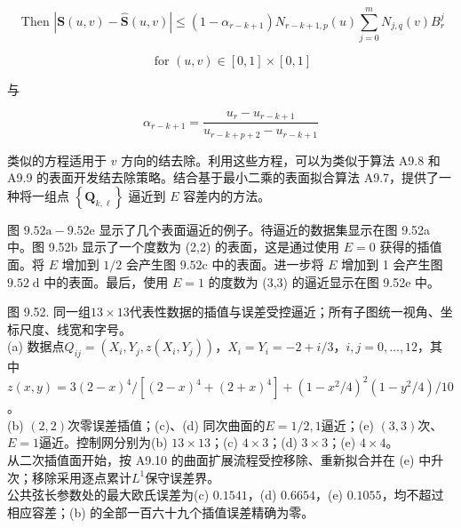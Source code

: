 \documentclass[../main.tex]{subfiles}
\begin{document}
\[
\text{ Then }\left| {\mathbf{S}\left( {u,v}\right)  - \widehat{\mathbf{S}}\left( {u,v}\right) }\right|  \leq  \left( {1 - {\alpha }_{r - k + 1}}\right) {N}_{r - k + 1,p}\left( u\right) \mathop{\sum }\limits_{{j = 0}}^{m}{N}_{j,q}\left( v\right) {B}_{r}^{j}
\]

\[
\text{ for }\left( {u,v}\right)  \in  \left\lbrack  {0,1}\right\rbrack   \times  \left\lbrack  {0,1}\right\rbrack   \tag{9.89}
\]

与

\[
{\alpha }_{r - k + 1} = \frac{{u}_{r} - {u}_{r - k + 1}}{{u}_{r - k + p + 2} - {u}_{r - k + 1}}
\]

类似的方程适用于 \(v\) 方向的结去除。利用这些方程，可以为类似于算法 A9.8 和 A9.9 的表面开发结去除策略。结合基于最小二乘的表面拟合算法 A9.7，提供了一种将一组点 \(\left\{  {\mathbf{Q}}_{k,\ell }\right\}\) 逼近到 \(E\) 容差内的方法。

图 \({9.52}\mathrm{a} - {9.52}\mathrm{e}\) 显示了几个表面逼近的例子。待逼近的数据集显示在图 9.52a 中。图 9.52b 显示了一个度数为 (2,2) 的表面，这是通过使用 \(E = 0\) 获得的插值面。将 \(E\) 增加到 \(1/2\) 会产生图 \({9.52}\mathrm{c}\) 中的表面。进一步将 \(E\) 增加到 1 会产生图 \({9.52}\mathrm{\;d}\) 中的表面。最后，使用 \(E = 1\) 的度数为 (3,3) 的逼近显示在图 9.52e 中。







\begin{center}
\begin{minipage}{34cm}
\vspace*{.6\baselineskip}
\centering
{}\par\smallskip
{}\par\smallskip
{}
\par\smallskip
图 9.52. 同一组$13\times13$代表性数据的插值与误差受控逼近；所有子图统一视角、坐标尺度、线宽和字号。\\
(a) 数据点$Q_{ij}=(X_i,Y_j,z(X_i,Y_j))$，$X_i=Y_i=-2+i/3$，$i,j=0,\ldots,12$，其中\\
$z(x,y)=3(2-x)^4/[(2-x)^4+(2+x)^4]+(1-x^2/4)^2(1-y^2/4)/10$。\\
(b) $(2,2)$次零误差插值；(c)、(d) 同次曲面的$E=1/2,1$逼近；(e) $(3,3)$次、$E=1$逼近。控制网分别为(b) $13\times13$；(c) $4\times3$；(d) $3\times3$；(e) $4\times4$。\\
从二次插值面开始，按 A9.10 的曲面扩展流程受控移除、重新拟合并在 (e) 中升次；移除采用逐点累计$L^1$保守误差界。\\
公共弦长参数处的最大欧氏误差为(c) $0.1541$，(d) $0.6654$，(e) $0.1055$，均不超过相应容差；(b) 的全部一百六十九个插值误差精确为零。
\end{minipage}
\end{center}
\end{document}
